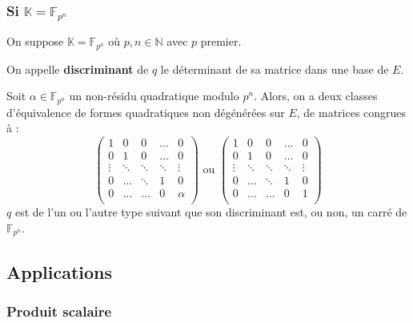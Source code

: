 	\subsubsection{Si \texorpdfstring{$\mathbb{K} = \mathbb{F}_{p^n}$}{K = Fₚₙ}}

	On suppose $\mathbb{K} = \mathbb{F}_{p^n}$ où $p, n \in \mathbb{N}$ avec $p$ premier.


	\begin{definition}
		On appelle \textbf{discriminant} de $q$ le déterminant de sa matrice dans une base de $E$.
	\end{definition}

	\begin{theorem}
		Soit $\alpha \in \mathbb{F}_{p^n}$ un non-résidu quadratique modulo $p^n$. Alors, on a deux classes d'équivalence de formes quadratiques non dégénérées sur $E$, de matrices congrues à :
		\[
			\begin{pmatrix}
				1 & 0 & 0 & \dots & 0 \\
				0 & 1 & 0 & \dots & 0 \\
				\vdots & \ddots & \ddots & \ddots & \vdots \\
				0 & \dots & \ddots & 1 & 0 \\
				0 & \dots & \dots & 0 & \alpha \\
			\end{pmatrix}
			\text{ ou }
			\begin{pmatrix}
				1 & 0 & 0 & \dots & 0 \\
				0 & 1 & 0 & \dots & 0 \\
				\vdots & \ddots & \ddots & \ddots & \vdots \\
				0 & \dots & \ddots & 1 & 0 \\
				0 & \dots & \dots & 0 & 1 \\
			\end{pmatrix}
		\]
		$q$ est de l'un ou l'autre type suivant que son discriminant est, ou non, un carré de $\mathbb{F}_{p^n}$.
	\end{theorem}

	\subsection{Applications}

	\subsubsection{Produit scalaire}

